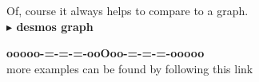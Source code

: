 \documentclass{ximera}
\begin{document}
Of, course it always helps to compare to a graph. \\








\textbf{\textcolor{blue!55!black}{$\blacktriangleright$ desmos graph}} 
\begin{center}
\end{center}
















\begin{center}
\textbf{\textcolor{green!50!black}{ooooo-=-=-=-ooOoo-=-=-=-ooooo}} \\

more examples can be found by following this link\\ 

\end{center}
\end{document}
